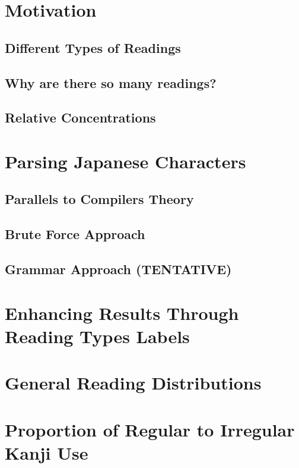 \section{Motivation}
\subsection{Different Types of Readings}
\subsection{Why are there so many readings?}
\subsection{Relative Concentrations}
\section{Parsing Japanese Characters}
\subsection{Parallels to Compilers Theory}
\subsection{Brute Force Approach}
\subsection{Grammar Approach (TENTATIVE)}
\section{Enhancing Results Through Reading Types Labels}
\section{General Reading Distributions}
\section{Proportion of Regular to Irregular Kanji Use}
